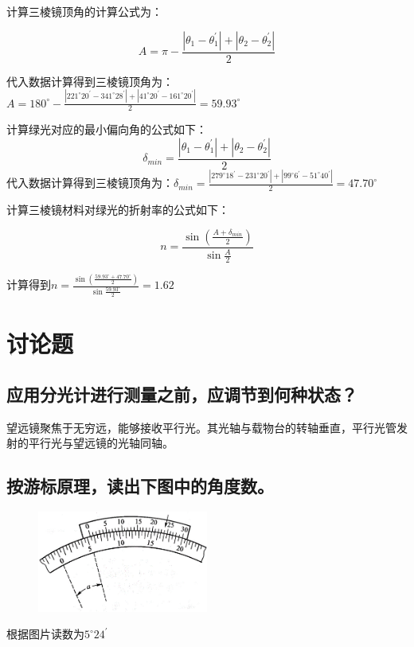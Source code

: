 \documentclass[signature=data]{physicsreport}
\begin{document}
\begin{enumerate}
    计算三棱镜顶角的计算公式为：

    $$A=\pi-\frac{|\theta_1-\theta_1^\prime|+|\theta_2-\theta_2^\prime|}{2}$$

    代入数据计算得到三棱镜顶角为：$A=180^\circ-\frac{|221^\circ20^\prime-341^\circ28^\prime|+|41^\circ20^\prime-161^\circ20^\prime|}{2}=59.93^\circ$

    计算绿光对应的最小偏向角的公式如下：
    $$\delta_{min} =\frac{|\theta_1-\theta_1^\prime|+|\theta_2-\theta_2^\prime|}{2}$$
    代入数据计算得到三棱镜顶角为：$\delta_{min} =\frac{|279^\circ18^\prime-231^\circ20^\prime|+|99^\circ6^\prime-51^\circ40^\prime|}{2}=47.70^\circ$


    计算三棱镜材料对绿光的折射率的公式如下：

    $$n=\frac{\sin(\frac{A+\delta_{min}}{2})}{\sin\frac{A}{2}}$$

    计算得到$n=\frac{\sin(\frac{59.93^\circ+47.70^\circ}{2})}{\sin\frac{59.93^\circ}{2}}=1.62$

\end{enumerate}




\pagebreak
\section{讨论题}

\subsection{应用分光计进行测量之前，应调节到何种状态？}

望远镜聚焦于无穷远，能够接收平行光。其光轴与载物台的转轴垂直，平行光管发射的平行光与望远镜的光轴同轴。


\subsection{按游标原理，读出下图中的角度数。}

\begin{figure}[H]
    \centering
    \includegraphics[width=0.5\textwidth]{images/lab14/image.png}
    \label{fig:lab13-fig1}
\end{figure}

根据图片读数为$5^{\circ}24^{\prime}$
\end{document}
